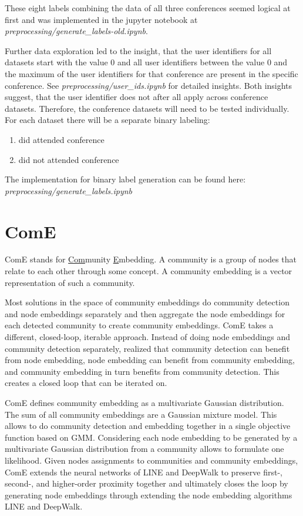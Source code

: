 \documentclass[sigconf]{acmart}
\begin{document}
These eight labels combining the data of all three conferences seemed logical at first and was implemented in the jupyter notebook at \textit{preprocessing/generate\_labels-old.ipynb}.

Further data exploration led to the insight, that the user identifiers for all datasets start with the value $0$ and all user identifiers between the value $0$ and the maximum of the user identifiers for that conference are present in the specific conference. See \textit{preprocessing/user\_ids.ipynb} for detailed insights. Both insights suggest, that the user identifier does not after all apply across conference datasets. Therefore, the conference datasets will need to be tested individually. For each dataset there will be a separate binary labeling:

\begin{enumerate}
	\item did attended conference
	\item did not attended conference
\end{enumerate}

The implementation for binary label generation can be found here: \textit{preprocessing/generate\_labels.ipynb}

\section{ComE}

ComE stands for \underline{Com}munity \underline{E}mbedding. A community is a group of nodes that relate to each other through some concept. A community embedding is a vector representation of such a community.

Most solutions in the space of community embeddings do community detection and node embeddings separately and then aggregate the node embeddings for each detected community to create community embeddings. ComE takes a different, closed-loop, iterable approach. Instead of doing node embeddings and community detection separately, \citeauthor{Cav17} realized that community detection can benefit from node embedding, node embedding can benefit from community embedding, and community embedding in turn benefits from community detection.\cite{Cav17} This creates a closed loop that can be iterated on.

ComE defines community embedding as a multivariate Gaussian distribution. The sum of all community embeddings are a Gaussian mixture model. This allows \citeauthor{Cav17} to do community detection and embedding together in a single objective function based on GMM.\cite{Cav17} Considering each node embedding to be generated by a multivariate Gaussian distribution from a community allows \citeauthor{Cav17} to formulate one likelihood. Given nodes assignments to communities and community embeddings, ComE extends the neural networks of LINE and DeepWalk to preserve first-, second-, and higher-order proximity together and ultimately closes the loop by generating node embeddings through extending the node embedding algorithms LINE and DeepWalk.\cite{Cav17}
\end{document}
